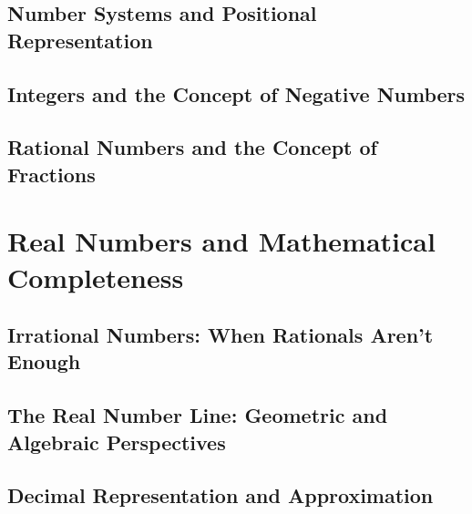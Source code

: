 \documentclass[12pt, oneside, openany]{book}
\let\oldchapter\chapter
\renewcommand{\chapter}{
	\cleardoublepage
	\thispagestyle{chapter}
	\oldchapter
}
\begin{document}
\section{Number Systems and Positional Representation}

\section{Integers and the Concept of Negative Numbers}

\section{Rational Numbers and the Concept of Fractions}


\chapter{Real Numbers and Mathematical Completeness}

\section{Irrational Numbers: When Rationals Aren't Enough}

\section{The Real Number Line: Geometric and Algebraic Perspectives}

\section{Decimal Representation and Approximation}
\end{document}
